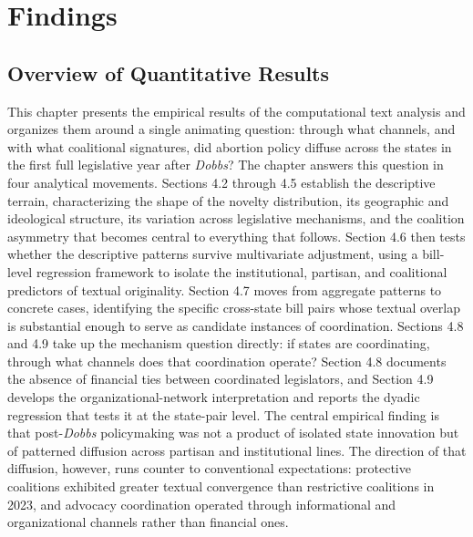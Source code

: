 \chapter{Findings}
\label{ch:findings}
\section{Overview of Quantitative Results}
\label{sec:findings_overview}

This chapter presents the empirical results of the computational text analysis and organizes them around a single animating question: through what channels, and with what coalitional signatures, did abortion policy diffuse across the states in the first full legislative year after \textit{Dobbs}? The chapter answers this question in four analytical movements. Sections 4.2 through 4.5 establish the descriptive terrain, characterizing the shape of the novelty distribution, its geographic and ideological structure, its variation across legislative mechanisms, and the coalition asymmetry that becomes central to everything that follows. Section 4.6 then tests whether the descriptive patterns survive multivariate adjustment, using a bill-level regression framework to isolate the institutional, partisan, and coalitional predictors of textual originality. Section 4.7 moves from aggregate patterns to concrete cases, identifying the specific cross-state bill pairs whose textual overlap is substantial enough to serve as candidate instances of coordination. Sections 4.8 and 4.9 take up the mechanism question directly: if states are coordinating, through what channels does that coordination operate? Section 4.8 documents the absence of financial ties between coordinated legislators, and Section 4.9 develops the organizational-network interpretation and reports the dyadic regression that tests it at the state-pair level.
The central empirical finding is that post-\textit{Dobbs} policymaking was not a product of isolated state innovation but of patterned diffusion across partisan and institutional lines. The direction of that diffusion, however, runs counter to conventional expectations: protective coalitions exhibited greater textual convergence than restrictive coalitions in 2023, and advocacy coordination operated through informational and organizational channels rather than financial ones.

